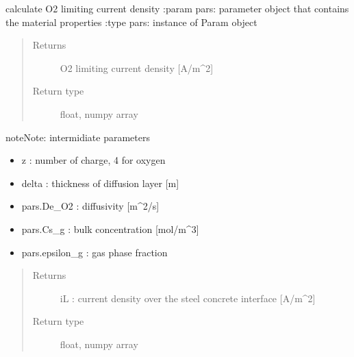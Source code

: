\documentclass[letterpaper,10pt,english]{sphinxmanual}
\begin{document}
\begin{fulllineitems}
\label{\detokenize{corrosion:corrosion.iL_f}}
\sphinxAtStartPar
calculate O2 limiting current density
:param pars: parameter object that contains the material properties
:type pars: instance of Param object
\begin{quote}\begin{description}
\item[{Returns}] \leavevmode
\sphinxAtStartPar
O2 limiting current density {[}A/m\textasciicircum{}2{]}

\item[{Return type}] \leavevmode
\sphinxAtStartPar
float, numpy array

\end{description}\end{quote}

\begin{sphinxadmonition}{note}{Note:}
\sphinxAtStartPar
intermidiate parameters
\begin{itemize}
\item {} 
\sphinxAtStartPar
z : number of charge, 4 for oxygen

\item {} 
\sphinxAtStartPar
delta : thickness of diffusion layer {[}m{]}

\item {} 
\sphinxAtStartPar
pars.De\_O2 : diffusivity {[}m\textasciicircum{}2/s{]}

\item {} 
\sphinxAtStartPar
pars.Cs\_g : bulk concentration {[}mol/m\textasciicircum{}3{]}

\item {} 
\sphinxAtStartPar
pars.epsilon\_g : gas phase fraction

\end{itemize}
\end{sphinxadmonition}
\begin{quote}\begin{description}
\item[{Returns}] \leavevmode
\sphinxAtStartPar
iL : current density over the steel concrete interface {[}A/m\textasciicircum{}2{]}

\item[{Return type}] \leavevmode
\sphinxAtStartPar
float, numpy array

\end{description}\end{quote}

\end{fulllineitems}
\end{document}
